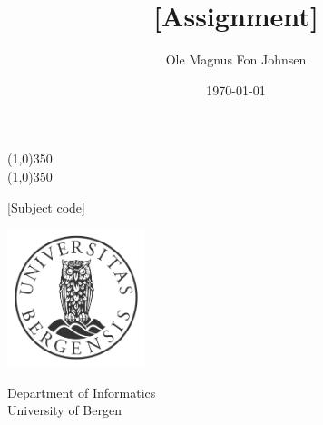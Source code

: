\documentclass[12pt]{article}
\title{[Assignment]}
\author{Ole Magnus Fon Johnsen}
\date{\today}
\begin{document}
    \begin{titlepage}
        \centering

        \line(1,0){350} \\
        \Huge{\textbf{\thetitle}}
        \line(1,0){350}

        \vspace{0.5cm}
        [Subject code]

        \vspace{1.5cm}

        \Large{\textbf{\theauthor}}

        \vfill
        \vspace{0.8cm}

        \includegraphics[width=0.3\textwidth]{uib-logo.png}

        Department of Informatics\\
        University of Bergen\\
        \thedate
    \end{titlepage}

    \tableofcontents

    
    

    \nocite{*}
    
\end{document}
